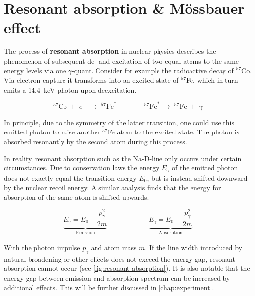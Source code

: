 
\section{Resonant absorption \& Mössbauer effect}
\label{sec:mössbauer-effect}

The process of \textbf{resonant absorption} in nuclear physics describes the 
phenomenon of subsequent de- and excitation of two equal atoms to the same energy 
levels via one $\gamma$-quant. Consider for example the radioactive decay of 
$^{57}$Co. Via electron capture it transforms into an excited state of $^{57}$Fe,
which in turn emits a \SI{14.4}{\kilo\electronvolt} photon upon deexcitation.

\begin{equation*}
^{57}\text{Co}\;+\;e^-\;\longrightarrow\;^{57}\text{Fe}^*\qquad\qquad^{57}\text{Fe}^*\;\longrightarrow\;^{57}\text{Fe}\;+\;\gamma  
\end{equation*}

In principle, due to the symmetry of the latter transition, one could use this 
emitted photon to raise another $^{57}$Fe atom to the excited state. The photon is 
absorbed resonantly by the second atom during this process.

In reality, resonant absorption such as the Na-D-line only occurs under certain
circumstances. Due to conservation laws the energy $E_\gamma$ of the emitted photon
does not exactly equal the transition energy $E_0$, but is instead shifted downward
by the nuclear recoil energy. A similar analysis finds that the energy for absorption
of the same atom is shifted upwards. 

\begin{equation}
\underbrace{E_\gamma = E_0 - \frac{p_\gamma^2}{2m}}_\text{Emission} \qquad\qquad\qquad \underbrace{E_\gamma = E_0 + \frac{p_\gamma^2}{2m}}_\text{Absorption}\label{eq:energy-gap}
\end{equation}

With the photon impulse $p_\gamma$ and atom mass $m$. If the line width introduced by
natural broadening or other effects does not exceed the energy gap, resonant 
absorption cannot occur (see \autoref{fig:resonant-absorption}). It is also notable 
that the energy gap between emission and absorption spectrum can be increased by 
additional effects. This will be further discussed in \autoref{chap:experiment}.

